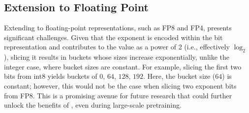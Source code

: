
\vspace*{-2mm}
\subsection{Extension to Floating Point}
\label{sec:fp}
\vspace*{-1mm}
Extending \alg to floating-point representations, such as FP8 and FP4, presents significant challenges. Given that the exponent is encoded within the bit representation and contributes to the value as a power of 2 (i.e., effectively $\log_\text{2}$), slicing it results in buckets whose sizes increase exponentially, unlike the integer case, where bucket sizes are constant. For example, slicing the first two bits from int8 yields buckets of $0$, $64$, $128$, $192$. Here, the bucket size ($64$) is constant; however, this would not be the case when slicing two exponent bits from FP8. This is a promising avenue for future research that could further unlock the benefits of \alg, even during large-scale pretraining.




